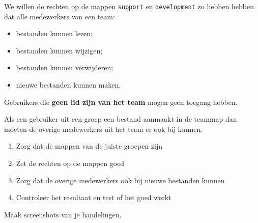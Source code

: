 We willen de rechten op de mappen \texttt{support} en \texttt{development} zo hebben hebben dat alle medewerkers van een team:
\begin{itemize}
\item bestanden kunnen lezen;
\item bestanden kunnen wijzigen;
\item bestanden kunnen verwijderen;
\item nieuwe bestanden kunnen maken.
\end{itemize}
Gebruikers die \textbf{geen lid zijn van het team} mogen geen toegang hebben.

Als een gebruiker uit een groep een bestand aanmaakt in de teammap dan moeten de overige medewerkers uit het team er ook bij kunnen.


\begin{enumerate}
\item Zorg dat de mappen van de juiste groepen zijn
\item Zet de rechten op de mappen goed
\item Zorg dat de overige medewerkers ook bij nieuwe bestanden kunnen
\item Controleer het resultaat en test of het goed werkt
\end{enumerate}

Maak screenshots van je handelingen.

